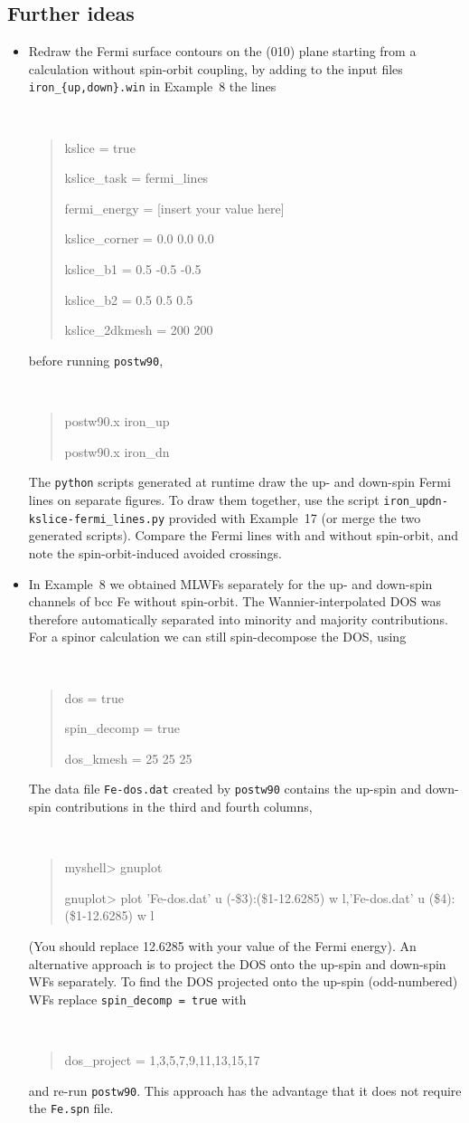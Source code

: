 \documentclass[a4paper,11pt,twoside]{article}
\begin{document}
\subsection*{Further ideas}

\begin{itemize}

\item Redraw the Fermi surface contours on the (010) plane starting
  from a calculation without spin-orbit coupling, by adding to the
  input files {\tt iron\_\{up,down\}.win} in Example~8 the lines {\tt
\begin{quote}
kslice = true

kslice\_task = fermi\_lines

fermi\_energy = [insert your value here] 

kslice\_corner = 0.0  0.0  0.0

kslice\_b1 =     0.5 -0.5 -0.5

kslice\_b2 =     0.5  0.5  0.5

kslice\_2dkmesh = 200 200
\end{quote} }
%
before running {\tt postw90},
%
{\tt
\begin{quote}
postw90.x iron\_up

postw90.x iron\_dn
\end{quote}
}
%
The {\tt python} scripts generated at runtime draw the up- and
down-spin Fermi lines on separate figures. To draw them together, use
the script {\tt iron\_updn-kslice-fermi\_lines.py} provided with
Example~17 (or merge the two generated scripts). Compare the Fermi
lines with and without spin-orbit, and note the spin-orbit-induced
avoided crossings.

\item In Example~8 we obtained MLWFs separately for the up- and down-spin
channels of bcc Fe without spin-orbit. The Wannier-interpolated DOS
was therefore automatically separated into minority and majority
contributions.  For a spinor calculation we can still spin-decompose
the DOS, using
%
{\tt
\begin{quote}
dos = true

spin\_decomp = true

dos\_kmesh = 25 25 25
\end{quote} }
%
The data file {\tt Fe-dos.dat} created by {\tt postw90} contains the
up-spin and down-spin contributions in the third and fourth columns,
%
{\tt
\begin{quote}
myshell> gnuplot

gnuplot> plot 'Fe-dos.dat' u (-\$3):(\$1-12.6285) w l,'Fe-dos.dat' u (\$4):(\$1-12.6285) w l
\end{quote} }
%
(You should replace 12.6285 with your value of the Fermi energy).  An
alternative approach is to project the DOS onto the up-spin and
down-spin WFs separately. To find the DOS projected onto the up-spin
(odd-numbered) WFs replace {\tt spin\_decomp = true} with
%
{\tt
\begin{quote}
  dos\_project = 1,3,5,7,9,11,13,15,17
\end{quote} }
%
and re-run {\tt postw90}. This approach has the advantage that it does
not require the {\tt Fe.spn} file.


\end{itemize}
\end{document}
